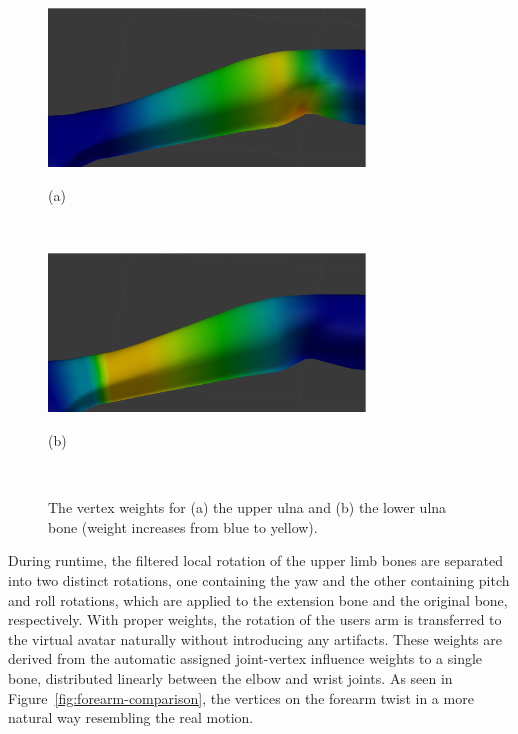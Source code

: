\documentclass[number,preprint,review,12pt]{elsarticle}
\begin{document}
\begin{figure}[htbp]
	\centerline{\includegraphics[width=0.75\textwidth]{./figures/ulna-weight.eps}}
	\centerline{(a)}
	\centerline{\ }
	\centerline{\includegraphics[width=0.75\textwidth]{./figures/ulna-extent-weight.eps}}
	\centerline{(b)} 
	\centerline{\ } 
	\caption{The vertex weights for (a) the upper ulna and (b) the lower ulna bone (weight increases from blue to yellow).}
	\label{fig:forearm-weights}
\end{figure}

During runtime, the filtered local rotation of the upper limb bones are separated into two distinct rotations, one containing the yaw and the other containing pitch and roll rotations, which are applied to the extension bone and the original bone, respectively. With proper weights, the rotation of the users arm is transferred to the virtual avatar naturally without introducing any artifacts. These weights are derived from the automatic assigned joint-vertex influence weights to a single bone, distributed linearly between the elbow and wrist joints. As seen in Figure~\ref{fig:forearm-comparison}, the vertices on the forearm twist in a more natural way resembling the real motion.
\end{document}
